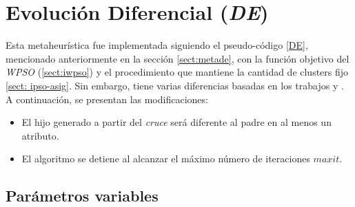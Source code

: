 \section{Evolución Diferencial (\emph{DE})}  \label{sect:ide}

    Esta metaheurística fue implementada siguiendo el pseudo-código \ref{DE}, 
mencionado anteriormente en la sección \ref{sect:metade}, con la
función objetivo del \emph{WPSO} (\ref{sect:iwpso}) y
el procedimiento que mantiene la cantidad de clusters fijo \ref{sect: ipso-asig}. Sin embargo, tiene
varias diferencias basadas en los trabajos \cite{SwAjAm2008} y \cite{OmEnSa2005}.
A continuación, se presentan las modificaciones:

\begin{itemize}
    \item El hijo generado a partir del \emph{cruce} será diferente al padre en
al menos un atributo.
    \item El algoritmo se detiene al alcanzar el máximo número de iteraciones
$maxit$.
\end{itemize}

\subsection{Parámetros variables}\label{sect:isde-pv} \label{sect:inde-pv}

